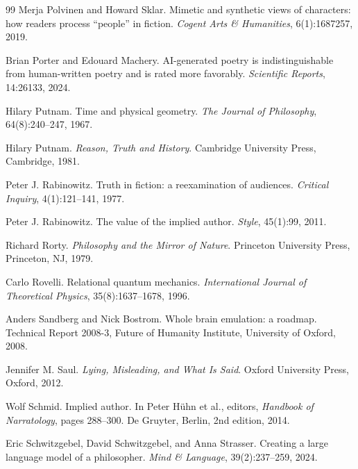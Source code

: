 \documentclass[11pt,a4paper]{article}
\theoremstyle{remark}\newtheorem{remark}[definition]{Remark}
\begin{document}
\begin{thebibliography}{99}
Merja Polvinen and Howard Sklar.
\newblock Mimetic and synthetic views of characters: how readers process ``people'' in fiction.
\newblock \emph{Cogent Arts \& Humanities}, 6(1):1687257, 2019.

Brian Porter and Edouard Machery.
\newblock AI-generated poetry is indistinguishable from human-written poetry and is rated more favorably.
\newblock \emph{Scientific Reports}, 14:26133, 2024.

Hilary Putnam.
\newblock Time and physical geometry.
\newblock \emph{The Journal of Philosophy}, 64(8):240--247, 1967.

Hilary Putnam.
\newblock \emph{Reason, Truth and History}.
\newblock Cambridge University Press, Cambridge, 1981.

Peter J. Rabinowitz.
\newblock Truth in fiction: a reexamination of audiences.
\newblock \emph{Critical Inquiry}, 4(1):121--141, 1977.

Peter J. Rabinowitz.
\newblock The value of the implied author.
\newblock \emph{Style}, 45(1):99, 2011.

Richard Rorty.
\newblock \emph{Philosophy and the Mirror of Nature}.
\newblock Princeton University Press, Princeton, NJ, 1979.

Carlo Rovelli.
\newblock Relational quantum mechanics.
\newblock \emph{International Journal of Theoretical Physics}, 35(8):1637--1678, 1996.

Anders Sandberg and Nick Bostrom.
\newblock Whole brain emulation: a roadmap.
\newblock Technical Report 2008-3, Future of Humanity Institute, University of Oxford, 2008.

Jennifer M. Saul.
\newblock \emph{Lying, Misleading, and What Is Said}.
\newblock Oxford University Press, Oxford, 2012.

Wolf Schmid.
\newblock Implied author.
\newblock In Peter H\"uhn et al., editors, \emph{Handbook of Narratology}, pages 288--300. De Gruyter, Berlin, 2nd edition, 2014.

Eric Schwitzgebel, David Schwitzgebel, and Anna Strasser.
\newblock Creating a large language model of a philosopher.
\newblock \emph{Mind \& Language}, 39(2):237--259, 2024.


\end{thebibliography}
\end{document}
